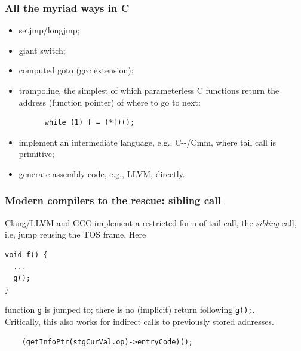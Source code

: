 \documentclass{beamer}
\begin{document}
\begin{frame}[fragile] %
\frametitle{All the myriad ways in C}
\begin{itemize}
\item<1-> setjmp/longjmp;
\\
\item<2-> giant switch;
\\
\item<3-> computed goto (gcc extension);
\\
\item<4-> trampoline, the simplest of which parameterless C functions return the
  address (function pointer) of where to go to next:
\begin{verbatim}
      while (1) f = (*f)();
\end{verbatim}
\item<5-> implement an intermediate language, e.g., C-{}-/Cmm, where tail call is primitive;
\\
\item<6-> generate assembly code, e.g., LLVM, directly.
\\
\end{itemize}
\end{frame}


\begin{frame}[fragile]
\frametitle{Modern compilers to the rescue:  sibling call}
Clang/LLVM and GCC implement a restricted form of tail call, the \emph{sibling}
call, i.e, jump reusing the TOS frame.  Here
\begin{verbatim}
void f() {
  ...
  g();
}
\end{verbatim}
function \texttt{g} is jumped to; there is no (implicit) return following
\texttt{g();}.  
\\\vspace{0.1in}
Critically, this also works for indirect calls to previously stored addresses.
\begin{verbatim}
    (getInfoPtr(stgCurVal.op)->entryCode)();
\end{verbatim}

\end{frame}
\end{document}
